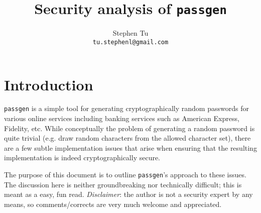 \documentclass[10pt]{article}
\title{Security analysis of \texttt{passgen}}
\date{}
\author{Stephen Tu \\ \texttt{tu.stephenl@gmail.com}}
\begin{document}
\maketitle

\section{Introduction}
\texttt{passgen} is a simple tool for generating cryptographically random
passwords for various online services including banking services such as
American Express, Fidelity, etc. While conceptually the problem of generating a
random password is quite trivial (e.g. draw random characters from the allowed
character set), there are a few subtle implementation issues that arise when
ensuring that the resulting implementation is indeed cryptographically secure.

The purpose of this document is to outline \texttt{passgen}'s approach to these
issues. The discussion here is neither groundbreaking nor technically
difficult; this is meant as a easy, fun read. \textit{Disclaimer}: the author is
not a security expert by any means, so comments/corrects are very much welcome
and appreciated.
\end{document}
